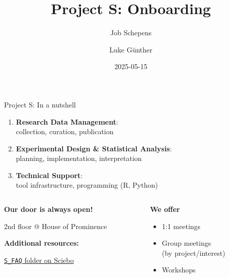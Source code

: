 \documentclass[
  ignorenonframetext,
  aspectratio=32,
]{beamer}
\title{Project S: Onboarding}
\author{Job Schepens \and Luke Günther}
\date{2025-05-15}
\providecommand{\tightlist}{%
  \setlength{\itemsep}{0pt}\setlength{\parskip}{0pt}}\usepackage{longtable,booktabs,array}
\begin{document}
\frame{\titlepage}


\begin{frame}[fragile]{Project S: In a nutshell}
\label{project-s-in-a-nutshell}
\vspace{.25cm}

\begin{enumerate}
\tightlist
\item
  \textbf{Research Data Management}:\\
  collection, curation, publication
\item
  \textbf{Experimental Design \& Statistical Analysis}:\\
  planning, implementation, interpretation
\item
  \textbf{Technical Support}:\\
  tool infrastructure, programming (R, Python)
\end{enumerate}

\vspace{.5cm}

\begin{columns}[T,onlytextwidth]
\begin{column}{0.48\linewidth}
\textbf{Our door is always open!}

2nd floor @ House of Prominence

\vspace{.5cm}

\textbf{Additional resources:}

\href{https://uni-koeln.sciebo.de/s/fvdR9aesnq7O5xu}{\texttt{S\_FAQ}
folder on Sciebo}
\end{column}

\hspace{1cm}

\begin{column}{0.48\linewidth}
\textbf{We offer}

\begin{itemize}
\tightlist
\item
  1:1 meetings
\item
  Group meetings\\
  (by project/interest)
\item
  Workshops
\end{itemize}
\end{column}
\end{columns}
\end{frame}
\end{document}
